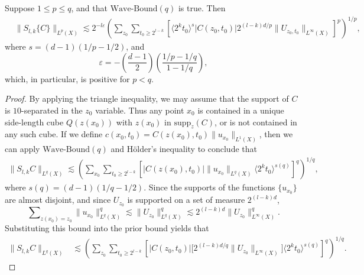\begin{lemma} \label{lemma:scaleupbound}
    Suppose $1 \leq p \leq q$, and that $\text{Wave-Bound}(q)$ is true. Then
    \begin{align*}
        &\| S_{l,k} \{ C \} \|_{L^p(X)}  \lesssim 2^{- l \varepsilon} \left( \sum\nolimits_{z_0} \sum\nolimits_{t_0 \geq 2^{l-k}} \left[ \langle 2^k t_0 \rangle^s |C(z_0,t_0)| 2^{(l-k)d/p} \| U_{z_0,t_0} \|_{L^\infty(X)} \right]^p \right)^{1/p},
    \end{align*}
    where $s = (d-1)(1/p - 1/2)$, and
    \[ \varepsilon = - \left( \frac{d-1}{2} \right) \left( \frac{1/p - 1/q}{1 - 1/q} \right), \]
    which, in particular, is positive for $p < q$.
\end{lemma}
\begin{proof}
    By applying the triangle inequality, we may assume that the support of $C$ is $10$-separated in the $z_0$ variable. Thus any point $x_0$ is contained in a unique side-length cube $Q(z(x_0))$ with $z(x_0)$ in $\text{supp}_z(C)$, or is not contained in any such cube. If we define $c(x_0,t_0) = C(z(x_0),t_0) \| u_{x_0} \|_{L^1(X)}$, then we can apply $\text{Wave-Bound}(q)$ and H\"{o}lder's inequality to conclude that
    \begin{equation}
    \begin{split}
      \| S_{l,k} C \|_{L^q(X)} \lesssim \left( \sum\nolimits_{x_0} \sum\nolimits_{t_0 \geq 2^{l-k}} \left[ |C(z(x_0),t_0)| \| u_{x_0} \|_{L^q(X)} \langle 2^k t_0 \rangle^{s(q)} \right]^q \right)^{1/q},
    \end{split}
    \end{equation}
    where $s(q) = (d-1)(1/q - 1/2)$. Since the supports of the functions $\{ u_{x_0} \}$ are almost disjoint, and since $U_{z_0}$ is supported on a set of measure $2^{(l-k)d}$,
    \begin{equation}
        \sum\nolimits_{z(x_0) = z_0} \| u_{x_0} \|_{L^q(X)}^q \lesssim \| U_{z_0} \|_{L^q(X)}^q \lesssim 2^{(l-k)d} \| U_{z_0} \|_{L^\infty(X)}^q.
    \end{equation}
    Substituting this bound into the prior bound yields that
    \begin{equation}
    \begin{split}
        \| S_{l,k} C \|_{L^q(X)} &\lesssim \left( \sum\nolimits_{z_0} \sum\nolimits_{t_0 \geq 2^{l-k}} \left[ |C(z_0,t_0)| \big[ 2^{(l-k)d/q} \| U_{z_0} \|_{L^\infty(X)} \big] \langle 2^k t_0 \rangle^{s(q)} \right]^q \right)^{1/q}.

\end{split}
\end{equation}
\end{proof}
